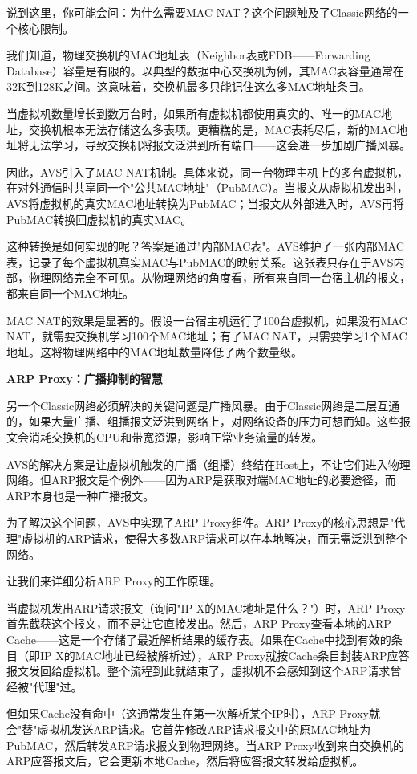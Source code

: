 说到这里，你可能会问：为什么需要MAC NAT？这个问题触及了Classic网络的一个核心限制。

我们知道，物理交换机的MAC地址表（Neighbor表或FDB——Forwarding Database）容量是有限的。以典型的数据中心交换机为例，其MAC表容量通常在32K到128K之间。这意味着，交换机最多只能记住这么多MAC地址条目。

当虚拟机数量增长到数万台时，如果所有虚拟机都使用真实的、唯一的MAC地址，交换机根本无法存储这么多表项。更糟糕的是，MAC表耗尽后，新的MAC地址将无法学习，导致交换机将报文泛洪到所有端口——这会进一步加剧广播风暴。

因此，AVS引入了MAC NAT机制。具体来说，同一台物理主机上的多台虚拟机，在对外通信时共享同一个"公共MAC地址"（PubMAC）。当报文从虚拟机发出时，AVS将虚拟机的真实MAC地址转换为PubMAC；当报文从外部进入时，AVS再将PubMAC转换回虚拟机的真实MAC。

这种转换是如何实现的呢？答案是通过"内部MAC表"。AVS维护了一张内部MAC表，记录了每个虚拟机真实MAC与PubMAC的映射关系。这张表只存在于AVS内部，物理网络完全不可见。从物理网络的角度看，所有来自同一台宿主机的报文，都来自同一个MAC地址。

MAC NAT的效果是显著的。假设一台宿主机运行了100台虚拟机，如果没有MAC NAT，就需要交换机学习100个MAC地址；有了MAC NAT，只需要学习1个MAC地址。这将物理网络中的MAC地址数量降低了两个数量级。

\textbf{ARP Proxy：广播抑制的智慧}

另一个Classic网络必须解决的关键问题是广播风暴。由于Classic网络是二层互通的，如果大量广播、组播报文泛洪到网络上，对网络设备的压力可想而知。这些报文会消耗交换机的CPU和带宽资源，影响正常业务流量的转发。

AVS的解决方案是让虚拟机触发的广播（组播）终结在Host上，不让它们进入物理网络。但ARP报文是个例外——因为ARP是获取对端MAC地址的必要途径，而ARP本身也是一种广播报文。

为了解决这个问题，AVS中实现了ARP Proxy组件。ARP Proxy的核心思想是"代理"虚拟机的ARP请求，使得大多数ARP请求可以在本地解决，而无需泛洪到整个网络。

让我们来详细分析ARP Proxy的工作原理。

当虚拟机发出ARP请求报文（询问"IP X的MAC地址是什么？"）时，ARP Proxy首先截获这个报文，而不是让它直接发出。然后，ARP Proxy查看本地的ARP Cache——这是一个存储了最近解析结果的缓存表。如果在Cache中找到有效的条目（即IP X的MAC地址已经被解析过），ARP Proxy就按Cache条目封装ARP应答报文发回给虚拟机。整个流程到此就结束了，虚拟机不会感知到这个ARP请求曾经被"代理"过。

但如果Cache没有命中（这通常发生在第一次解析某个IP时），ARP Proxy就会"替"虚拟机发送ARP请求。它首先修改ARP请求报文中的原MAC地址为PubMAC，然后转发ARP请求报文到物理网络。当ARP Proxy收到来自交换机的ARP应答报文后，它会更新本地Cache，然后将应答报文转发给虚拟机。

